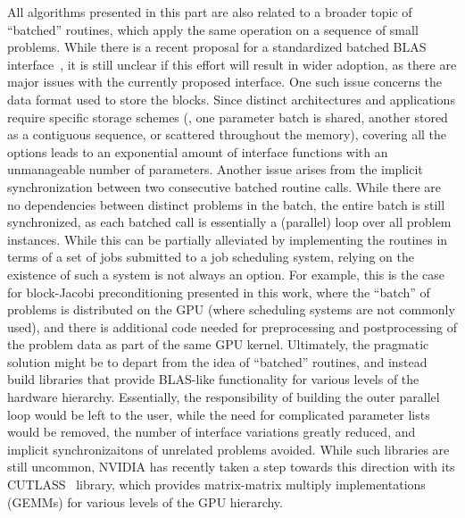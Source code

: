 All algorithms presented in this part are also related to a broader topic of
``batched'' routines, which apply the same operation on a sequence of small
problems. While there is a recent proposal for a standardized batched BLAS
interface~\cite{batched-blas}, it is still unclear if this effort will result in
wider adoption, as there are major issues with the currently proposed interface.
One such issue concerns the data format used to store the blocks. Since distinct
architectures and applications require specific storage schemes (\eg, one
parameter batch is shared, another stored as a contiguous sequence, or scattered
throughout the memory), covering all the options leads to an exponential
amount of interface functions with an unmanageable number of parameters.
Another issue arises from the implicit synchronization between two consecutive
batched routine calls. While there are no dependencies between distinct problems
in the batch, the entire batch is still synchronized, as each batched call is
essentially a (parallel) loop over all problem instances. While this can be
partially alleviated by implementing the routines in terms of a set of jobs
submitted to a job scheduling system, relying on the existence of such a system
is not always an option. For example, this is the case for block-Jacobi
preconditioning presented in this work, where the ``batch'' of problems is
distributed on the GPU (where scheduling systems are not commonly used),
and there is additional code needed for preprocessing and postprocessing of the
problem data as part of the same GPU kernel. Ultimately, the pragmatic solution
might be to depart from the idea of ``batched'' routines, and instead build
libraries that provide BLAS-like functionality for various levels of the
hardware hierarchy.  Essentially, the responsibility of building the outer
parallel loop would be left to the user, while the need for complicated
parameter lists would be removed, the number of interface variations greatly
reduced, and implicit synchronizaitons of unrelated problems avoided. While such
libraries are still uncommon, NVIDIA has recently taken a step towards this
direction with its CUTLASS~\cite{cutlass} library, which provides matrix-matrix
multiply implementations (GEMMs) for various levels of the GPU hierarchy.

